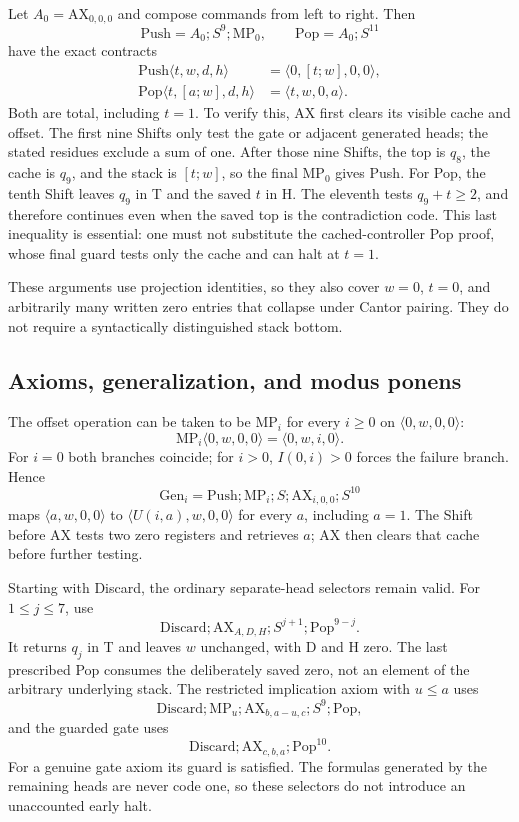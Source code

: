 Let $A_0=\mathrm{AX}_{0,0,0}$ and compose commands from left to right.
Then
\[
 \mathrm{Push}=A_0;S^9;\mathrm{MP}_0,
 \qquad
 \mathrm{Pop}=A_0;S^{11}
\]
have the exact contracts
\begin{align*}
 \mathrm{Push}\langle t,w,d,h\rangle
   &=\langle0,[t;w],0,0\rangle,\\
 \mathrm{Pop}\langle t,[a;w],d,h\rangle
   &=\langle t,w,0,a\rangle.
\end{align*}
Both are total, including $t=1$. To verify this, AX first clears its
visible cache and offset. The first nine Shifts only test the gate or
adjacent generated heads; the stated residues exclude a sum of one.
After those nine Shifts, the top is $q_8$, the cache is $q_9$, and the
stack is $[t;w]$, so the final $\mathrm{MP}_0$ gives Push.
For Pop, the tenth Shift leaves $q_9$ in T and the saved $t$ in H.
The eleventh tests $q_9+t\ge2$, and therefore continues even when the
saved top is the contradiction code. This last inequality is essential:
one must not substitute the cached-controller Pop proof, whose final
guard tests only the cache and can halt at $t=1$.

These arguments use projection identities, so they also cover $w=0$,
$t=0$, and arbitrarily many written zero entries that collapse under
Cantor pairing. They do not require a syntactically distinguished stack
bottom.

\subsection{Axioms, generalization, and modus ponens}

The offset operation can be taken to be $\mathrm{MP}_i$ for every
$i\ge0$ on $\langle0,w,0,0\rangle$:
\[
 \mathrm{MP}_i\langle0,w,0,0\rangle=\langle0,w,i,0\rangle.
\]
For $i=0$ both branches coincide; for $i>0$, $I(0,i)>0$ forces the
failure branch. Hence
\[
 \mathrm{Gen}_i=
 \mathrm{Push};\mathrm{MP}_i;S;\mathrm{AX}_{i,0,0};S^{10}
\]
maps $\langle a,w,0,0\rangle$ to
$\langle U(i,a),w,0,0\rangle$ for every $a$, including $a=1$.
The Shift before AX tests two zero registers and retrieves $a$;
AX then clears that cache before further testing.

Starting with Discard, the ordinary separate-head selectors remain
valid. For $1\le j\le7$, use
\[
 \mathrm{Discard};\mathrm{AX}_{A,D,H};S^{j+1};\mathrm{Pop}^{9-j}.
\]
It returns $q_j$ in T and leaves $w$ unchanged, with D and H zero.
The last prescribed Pop consumes the deliberately saved zero, not an
element of the arbitrary underlying stack. The restricted implication
axiom with $u\le a$ uses
\[
 \mathrm{Discard};\mathrm{MP}_u;
 \mathrm{AX}_{b,a-u,c};S^9;\mathrm{Pop},
\]
and the guarded gate uses
\[
 \mathrm{Discard};\mathrm{AX}_{c,b,a};\mathrm{Pop}^{10}.
\]
For a genuine gate axiom its guard is satisfied. The formulas generated
by the remaining heads are never code one, so these selectors do not
introduce an unaccounted early halt.


